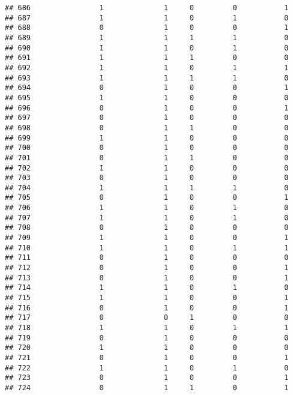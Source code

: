 \documentclass[]{article}
\begin{document}
\begin{verbatim}
## 686                1              1     0         0           1
## 687                1              1     0         1           0
## 688                0              1     0         0           1
## 689                1              1     1         1           0
## 690                1              1     0         1           0
## 691                1              1     1         0           0
## 692                1              1     0         1           1
## 693                1              1     1         1           0
## 694                0              1     0         0           1
## 695                1              1     0         0           0
## 696                0              1     0         0           1
## 697                0              1     0         0           0
## 698                0              1     1         0           0
## 699                1              1     0         0           0
## 700                0              1     0         0           0
## 701                0              1     1         0           0
## 702                1              1     0         0           0
## 703                0              1     0         0           0
## 704                1              1     1         1           0
## 705                0              1     0         0           1
## 706                1              1     0         1           0
## 707                1              1     0         1           0
## 708                0              1     0         0           0
## 709                1              1     0         0           1
## 710                1              1     0         1           1
## 711                0              1     0         0           0
## 712                0              1     0         0           1
## 713                0              1     0         0           1
## 714                1              1     0         1           0
## 715                1              1     0         0           1
## 716                0              1     0         0           1
## 717                0              0     1         0           0
## 718                1              1     0         1           1
## 719                0              1     0         0           0
## 720                1              1     0         0           0
## 721                0              1     0         0           1
## 722                1              1     0         1           0
## 723                0              1     0         0           1
## 724                0              1     1         0           1

\end{verbatim}
\end{document}
